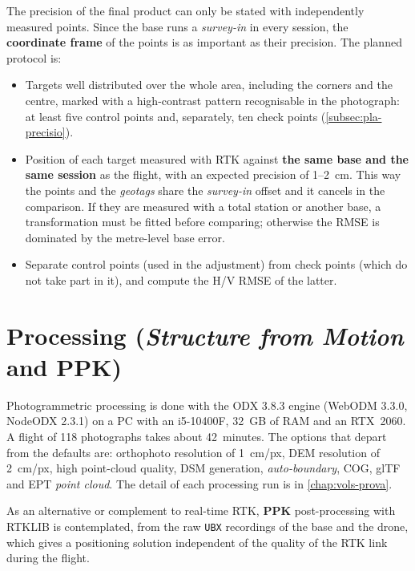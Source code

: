 The precision of the final product can only be stated with independently measured points. Since the base runs a \emph{survey-in} in every session, the \textbf{coordinate frame} of the points is as important as their precision. The planned protocol is:
\begin{itemize}
    \item Targets well distributed over the whole area, including the corners and the centre, marked with a high-contrast pattern recognisable in the photograph: at least five control points and, separately, ten check points (\cref{subsec:pla-precisio}).
    \item Position of each target measured with RTK against \textbf{the same base and the same session} as the flight, with an expected precision of 1--2~cm. This way the points and the \emph{geotags} share the \emph{survey-in} offset and it cancels in the comparison. If they are measured with a total station or another base, a transformation must be fitted before comparing; otherwise the RMSE is dominated by the metre-level base error.
    \item Separate control points (used in the adjustment) from check points (which do not take part in it), and compute the H/V RMSE of the latter.
\end{itemize}


\section{Processing (\emph{Structure from Motion} and PPK)}
\label{sec:processament}

Photogrammetric processing is done with the ODX 3.8.3 engine (WebODM 3.3.0, NodeODX 2.3.1) on a PC with an i5-10400F, 32~GB of RAM and an RTX~2060. A flight of 118 photographs takes about 42~minutes. The options that depart from the defaults are: orthophoto resolution of 1~cm/px, DEM resolution of 2~cm/px, high point-cloud quality, DSM generation, \emph{auto-boundary}, COG, glTF and EPT \emph{point cloud}. The detail of each processing run is in \cref{chap:vols-prova}.

As an alternative or complement to real-time RTK, \textbf{PPK} post-processing with RTKLIB is contemplated, from the raw \texttt{UBX} recordings of the base and the drone, which gives a positioning solution independent of the quality of the RTK link during the flight.


